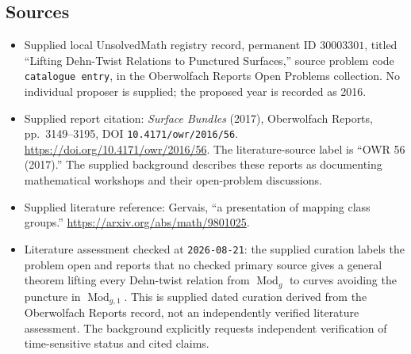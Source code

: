 \documentclass[11pt]{article}
\begin{document}
\subsection{Sources}
\begin{itemize}
\item Supplied local UnsolvedMath registry record, permanent ID \(30003301\), titled ``Lifting Dehn-Twist Relations to Punctured Surfaces,'' source problem code \texttt{catalogue entry}, in the Oberwolfach Reports Open Problems collection. No individual proposer is supplied; the proposed year is recorded as 2016.
\item Supplied report citation: \emph{Surface Bundles} (2017), Oberwolfach Reports, pp.\ 3149--3195, DOI \texttt{10.4171/owr/2016/56}. \url{https://doi.org/10.4171/owr/2016/56}. The literature-source label is ``OWR 56 (2017).'' The supplied background describes these reports as documenting mathematical workshops and their open-problem discussions.
\item Supplied literature reference: Gervais, ``a presentation of mapping class groups.'' \url{https://arxiv.org/abs/math/9801025}.
\item Literature assessment checked at \texttt{2026-08-21}: the supplied curation labels the problem open and reports that no checked primary source gives a general theorem lifting every Dehn-twist relation from \(\operatorname{Mod}_g\) to curves avoiding the puncture in \(\operatorname{Mod}_{g,1}\). This is supplied dated curation derived from the Oberwolfach Reports record, not an independently verified literature assessment. The background explicitly requests independent verification of time-sensitive status and cited claims.
\end{itemize}
\end{document}
